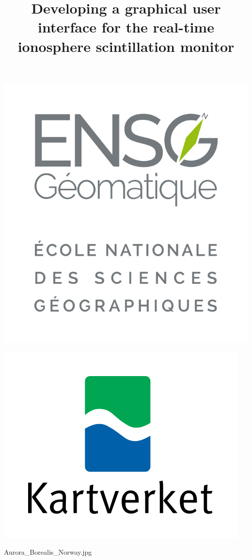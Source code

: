 \documentclass{themeensg}
\title{Developing a graphical user interface for the real-time ionosphere scintillation monitor}
\begin{document}
\begin{titlepage}
\begin{minipage}{.5\textwidth}
  \includegraphics[width=.5\linewidth]{images/logos/ensg_logo.png}
\end{minipage}
\begin{minipage}{.5\textwidth}
  \centering
  \includegraphics[width=.5\linewidth]{images/logos/kartverket_logo.png}
\end{minipage}

\shorthandoff{:}

{Aurora_Borealis_Norway.jpg}

\end{titlepage}



\end{document}
